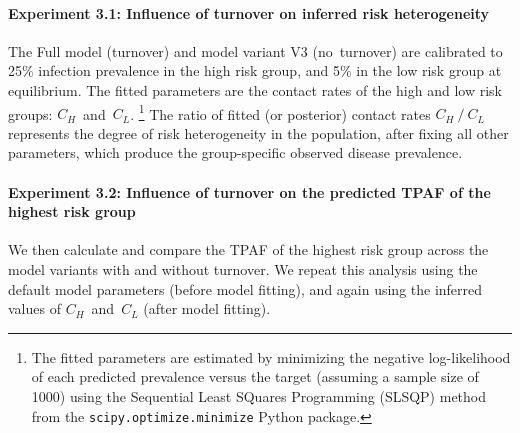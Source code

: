 \paragraph{Experiment 3.1: Influence of turnover on inferred risk heterogeneity}
The Full model (turnover) and model variant V3 (no~turnover) are calibrated to
25\% infection prevalence in the high risk group, and %
5\% in the low risk group at equilibrium.
The fitted parameters are
the contact rates of the high and low risk groups: $C_H$~and~$C_L$.%
\footnote{The fitted parameters are estimated by minimizing
  the negative log-likelihood of each predicted prevalence versus the target
  (assuming a sample size of 1000)
  using the Sequential Least SQuares Programming (SLSQP) method~\citep{Kraft1988}
  from the \texttt{scipy.optimize.minimize} Python package.}
The ratio of fitted (or posterior) contact rates $C_H~/~C_L$
represents the degree of risk heterogeneity in the population, after fixing all other parameters,
which produce the group-specific observed disease prevalence.
\paragraph{Experiment 3.2: Influence of turnover on the predicted TPAF of the highest risk group}
We then calculate and compare the TPAF of the highest risk group
across the model variants with and without turnover.
We repeat this analysis using the default model parameters (before model fitting),
and again using the inferred values of $C_H$~and~$C_L$ (after model fitting).
